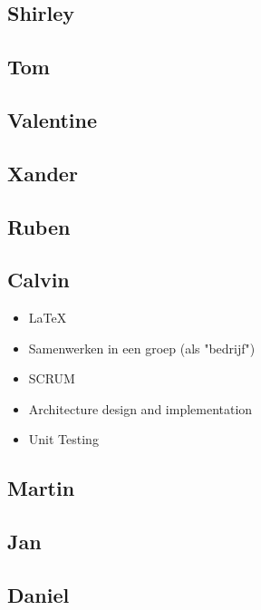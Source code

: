\documentclass{article}
\begin{document}
\subsection*{Shirley}
\subsection*{Tom}
\subsection*{Valentine}
\subsection*{Xander}
\subsection*{Ruben}
\subsection*{Calvin}
\begin{itemize}
 	\item \LaTeX
	\item Samenwerken in een groep (als "bedrijf")
	\item SCRUM
	\item Architecture design and  implementation
	\item Unit Testing
\end{itemize}
\subsection*{Martin}
\subsection*{Jan}
\subsection*{Daniel} 
\end{document}
